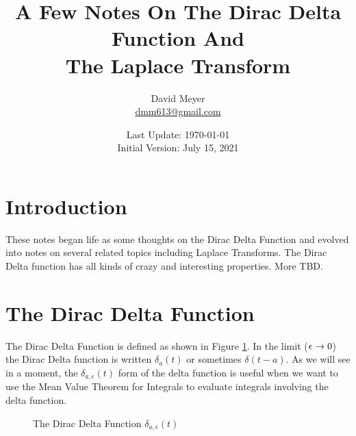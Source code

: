 \documentclass{article}
\title{A Few Notes On The Dirac Delta Function And \\ The Laplace Transform}
\author{David Meyer \\ \href{mailto:dmm613@gmail.com}
                            {dmm613@gmail.com}}
\date{Last Update: \today \\
	 {\vspace{1.00mm} \small Initial Version: July 15, 2021}}
\theoremstyle{definition}
\begin{document}
\maketitle
%
%
%
\section{Introduction}
These notes began life as some thoughts on the Dirac Delta
Function and evolved into notes on several related topics
including Laplace Transforms. The Dirac Delta function has all
kinds of crazy and interesting properties. More TBD.

\section{The Dirac Delta Function}
The Dirac Delta Function is defined as shown in Figure
\ref{fig:delta}. In the limit ($\mathlarger{\epsilon} \to 0$) the
Dirac Delta function is written $\delta_a(t)$ or sometimes
$\delta(t - a)$. As we will see in a moment, the
$\delta_{a,\epsilon}(t)$ form of the delta function is useful
when we want to use the Mean Value Theorem for Integrals
\cite{wiki:meam_value_theorem_for_integrals} to evaluate
integrals involving the delta function.
 
\bigskip

\begin{figure}[H]
  \centering
  \caption{The Dirac Delta Function $\delta_{a,\epsilon}(t)$}
  \label{fig:delta}
\end{figure}
\end{document}

